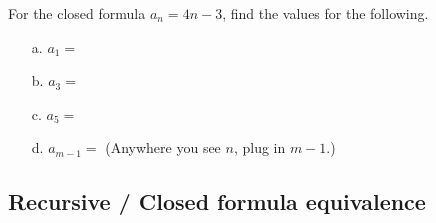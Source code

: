 \documentclass[../Template-Assignment.tex]{subfiles}
\begin{document}
        \hrulefill

        \begin{questionNOGRADE}{\thequestion}

            For the closed formula $a_{n} = 4n - 3$,
            find the values for the following.

            \begin{itemize}
                \item[a.] $a_{1} = $    
                \item[b.] $a_{3} = $    
                \item[c.] $a_{5} = $    
                \item[d.] $a_{m-1} = $  (Anywhere you see $n$, plug in $m-1$.) \\
            \end{itemize}
            
        \end{questionNOGRADE}

    \newpage

    \subsection{Recursive / Closed formula equivalence}
\end{document}
